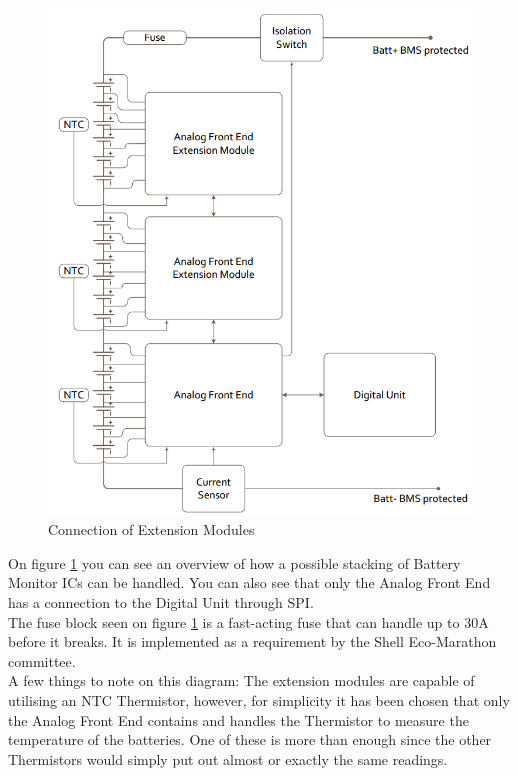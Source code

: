 \begin{figure}[H]
	\centering
	\includegraphics[width=1.0\linewidth]{Hardware/Pictures/BMSextensionmod}
	\caption[Empty]{Connection of Extension Modules\footnotemark}
	\label{fig:BMSextensionmod}
\end{figure}

On figure \ref{fig:BMSextensionmod} you can see an overview of how a possible stacking of Battery Monitor ICs can be handled. You can also see that only the Analog Front End has a connection to the Digital Unit through SPI.\\
The fuse block seen on figure \ref{fig:BMSextensionmod} is a fast-acting fuse that can handle up to 30A before it breaks. It is implemented as a requirement by the Shell Eco-Marathon committee.\\
A few things to note on this diagram: The extension modules are capable of utilising an NTC Thermistor, however, for simplicity it has been chosen that only the Analog Front End contains and handles the Thermistor to measure the temperature of the batteries. One of these is more than enough since the other Thermistors would simply put out almost or exactly the same readings.

